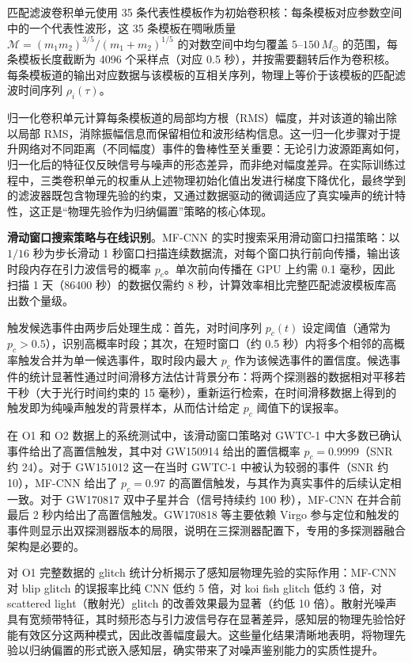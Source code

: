 匹配滤波卷积单元使用 35 条代表性模板作为初始卷积核：每条模板对应参数空间中的一个代表性波形，这 35 条模板在啁啾质量 $\mathcal{M} = (m_1 m_2)^{3/5}/(m_1+m_2)^{1/5}$ 的对数空间中均匀覆盖 $5$--$150\,M_\odot$ 的范围，每条模板长度截断为 4096 个采样点（对应 0.5 秒），并按需要翻转后作为卷积核。每条模板道的输出对应数据与该模板的互相关序列，物理上等价于该模板的匹配滤波时间序列 $\rho_i(\tau)$。

归一化卷积单元计算每条模板道的局部均方根（RMS）幅度，并对该道的输出除以局部 RMS，消除振幅信息而保留相位和波形结构信息。这一归一化步骤对于提升网络对不同距离（不同幅度）事件的鲁棒性至关重要：无论引力波源距离如何，归一化后的特征仅反映信号与噪声的形态差异，而非绝对幅度差异。在实际训练过程中，三类卷积单元的权重从上述物理初始化值出发进行梯度下降优化，最终学到的滤波器既包含物理先验的约束，又通过数据驱动的微调适应了真实噪声的统计特性，这正是“物理先验作为归纳偏置”策略的核心体现。

\textbf{滑动窗口搜索策略与在线识别}。MF-CNN 的实时搜索采用滑动窗口扫描策略：以 $1/16$ 秒为步长滑动 1 秒窗口扫描连续数据流，对每个窗口执行前向传播，输出该时段内存在引力波信号的概率 $p_c$。单次前向传播在 GPU 上约需 0.1 毫秒，因此扫描 1 天（86400 秒）的数据仅需约 8 秒，计算效率相比完整匹配滤波模板库高出数个量级。

触发候选事件由两步后处理生成：首先，对时间序列 $p_c(t)$ 设定阈值（通常为 $p_c > 0.5$），识别高概率时段；其次，在短时窗口（约 0.5 秒）内将多个相邻的高概率触发合并为单一候选事件，取时段内最大 $p_c$ 作为该候选事件的置信度。候选事件的统计显著性通过时间滑移方法估计背景分布：将两个探测器的数据相对平移若干秒（大于光行时间约束的 15 毫秒），重新运行检索，在时间滑移数据上得到的触发即为纯噪声触发的背景样本，从而估计给定 $p_c$ 阈值下的误报率。

在 O1 和 O2 数据上的系统测试中，该滑动窗口策略对 GWTC-1 中大多数已确认事件给出了高置信触发，其中对 GW150914 给出的置信概率 $p_c = 0.9999$（SNR 约 24）。对于 GW151012 这一在当时 GWTC-1 中被认为较弱的事件（SNR 约 10），MF-CNN 给出了 $p_c = 0.97$ 的高置信触发，与其作为真实事件的后续认定相一致。对于 GW170817 双中子星并合（信号持续约 100 秒），MF-CNN 在并合前最后 2 秒内给出了高置信触发。GW170818 等主要依赖 Virgo 参与定位和触发的事件则显示出双探测器版本的局限，说明在三探测器配置下，专用的多探测器融合架构是必要的。

对 O1 完整数据的 glitch 统计分析揭示了感知层物理先验的实际作用：MF-CNN 对 blip glitch 的误报率比纯 CNN 低约 5 倍，对 koi fish glitch 低约 3 倍，对 scattered light（散射光）glitch 的改善效果最为显著（约低 10 倍）。散射光噪声具有宽频带特征，其时频形态与引力波信号存在显著差异，感知层的物理先验恰好能有效区分这两种模式，因此改善幅度最大。这些量化结果清晰地表明，将物理先验以归纳偏置的形式嵌入感知层，确实带来了对噪声鉴别能力的实质性提升。

